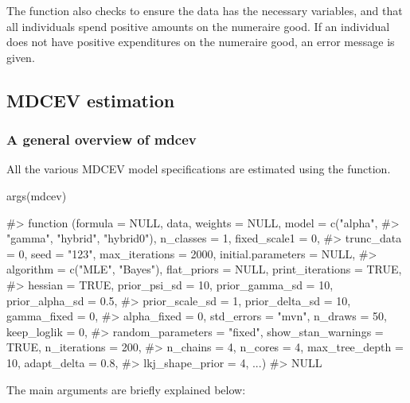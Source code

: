 The  function also checks to ensure the data has the
necessary variables, and that all individuals spend positive amounts on
the numeraire good. If an individual does not have positive expenditures
on the numeraire good, an error message is given.

\hypertarget{mdcev-estimation}{%
\subsection{MDCEV estimation}\label{mdcev-estimation}}

\hypertarget{a-general-overview-of-mdcev}{%
\subsubsection{A general overview of
mdcev}\label{a-general-overview-of-mdcev}}

All the various MDCEV model specifications are estimated using the
 function.

\begin{Schunk}
\begin{Sinput}
args(mdcev)
\end{Sinput}
\begin{Soutput}
#> function (formula = NULL, data, weights = NULL, model = c("alpha", 
#>     "gamma", "hybrid", "hybrid0"), n_classes = 1, fixed_scale1 = 0, 
#>     trunc_data = 0, seed = "123", max_iterations = 2000, initial.parameters = NULL, 
#>     algorithm = c("MLE", "Bayes"), flat_priors = NULL, print_iterations = TRUE, 
#>     hessian = TRUE, prior_psi_sd = 10, prior_gamma_sd = 10, prior_alpha_sd = 0.5, 
#>     prior_scale_sd = 1, prior_delta_sd = 10, gamma_fixed = 0, 
#>     alpha_fixed = 0, std_errors = "mvn", n_draws = 50, keep_loglik = 0, 
#>     random_parameters = "fixed", show_stan_warnings = TRUE, n_iterations = 200, 
#>     n_chains = 4, n_cores = 4, max_tree_depth = 10, adapt_delta = 0.8, 
#>     lkj_shape_prior = 4, ...) 
#> NULL
\end{Soutput}
\end{Schunk}

The main arguments are briefly explained below:

